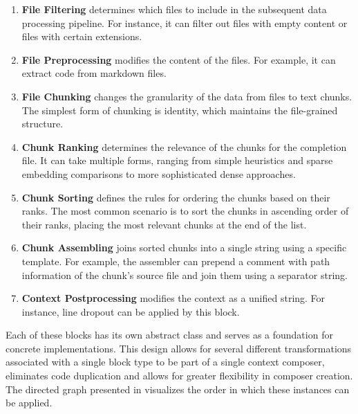 \begin{enumerate}
    \item \textbf{File Filtering} determines which files to include in the subsequent data processing pipeline. For instance, it can filter out files with empty content or files with certain extensions.
    \item \textbf{File Preprocessing} modifies the content of the files. For example, it can extract code from markdown files.
    \item \textbf{File Chunking} changes the granularity of the data from files to text chunks. The simplest form of chunking is identity, which maintains the file-grained structure.
    \item \textbf{Chunk Ranking} determines the relevance of the chunks for the completion file. It can take multiple forms, ranging from simple heuristics and sparse embedding comparisons to more sophisticated dense approaches.
    \item \textbf{Chunk Sorting} defines the rules for ordering the chunks based on their ranks. The most common scenario is to sort the chunks in ascending order of their ranks, placing the most relevant chunks at the end of the list.
    \item \textbf{Chunk Assembling} joins sorted chunks into a single string using a specific template. For example, the assembler can prepend a comment with path information of the chunk's source file and join them using a separator string.
    \item \textbf{Context Postprocessing} modifies the context as a unified string. For instance, line dropout can be applied by this block.
\end{enumerate}

Each of these blocks has its own abstract class and serves as a foundation for concrete implementations. This design allows for several different transformations associated with a single block type to be part of a single context composer, eliminates code duplication and allows for greater flexibility in composer creation. The directed graph presented in  visualizes the order in which these instances can be applied.

